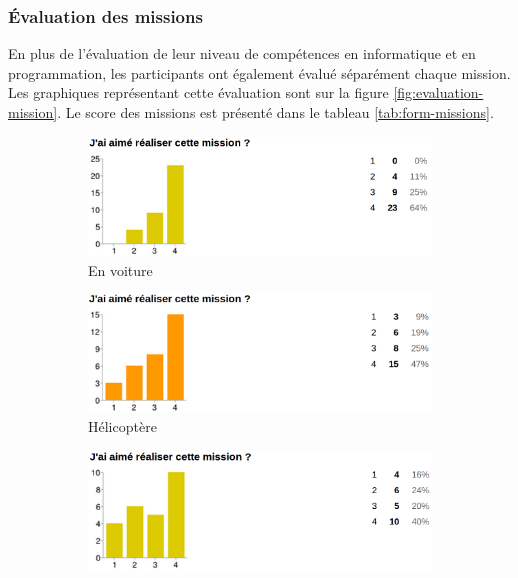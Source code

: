 \subsubsection{Évaluation des missions}
\label{appreciation}
En plus de l'évaluation de leur niveau de compétences en informatique et en programmation, les participants ont également évalué séparément chaque mission. Les graphiques représentant cette évaluation sont sur la figure \ref{fig:evaluation-mission}. Le score des missions est présenté dans le tableau \ref{tab:form-missions}.
\begin{figure}
  \begin{center}
    \begin{subfigure}{.49\textwidth}
      \includegraphics[width=\textwidth]{content/8-validation/images/voiture}
      \caption{En voiture}
    \end{subfigure}
    \begin{subfigure}{.49\textwidth}
      \includegraphics[width=\textwidth]{content/8-validation/images/helico}
      \caption{Hélicoptère}
    \end{subfigure}
    \begin{subfigure}{.49\textwidth}
      \includegraphics[width=\textwidth]{content/8-validation/images/courtois}

\end{subfigure}
\end{center}
\end{figure}
